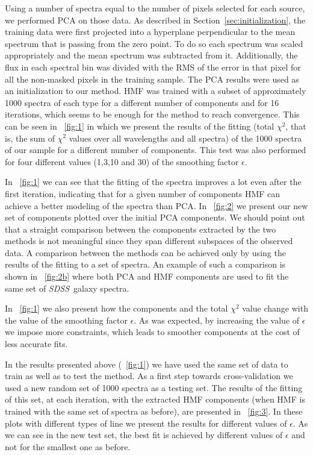 \documentclass[12pt,preprint]{aastex}
\newcommand{\project}[1]{\textsl{#1}}
\newcommand{\sdss}{\project{SDSS}}
\newcommand{\SDSS}{\sdss}
\newcommand{\sectionname}{Section}
\begin{document}
Using a number of spectra equal to the number of pixels selected for
each source, we performed PCA on those data. As described in 
\sectionname~\ref{sec:initialization}, the training data were
first projected into a hyperplane perpendicular to the mean
spectrum that is passing from the zero point. To do so each spectrum 
was scaled appropriately and the mean spectrum was subtracted from it. 
Additionally, the flux in each spectral bin was divided
with the RMS of the error in that pixel for all the non-masked pixels in
the training sample. The PCA results were used as an initialization to
our method. HMF was trained with a subset of approximately 1000
spectra of each type for a different number of components and for 16
iterations, which seems to be enough for the method to reach convergence. This
can be seen in \figurename~\ref{fig:1} in which we present the results of
the fitting (total $\chi^2$, that is, the sum of $\chi^2$ values over all
wavelengths and all spectra) of the 1000 spectra of our sample for a
different number of components. This test was also performed for four
different values (1,3,10 and 30) of the smoothing factor $\epsilon$.

In \figurename~\ref{fig:1} we can see that the fitting of the spectra
improves a lot even after the first iteration, indicating that for a 
given number of components HMF can achieve a better
modeling of the spectra than PCA. In \figurename~\ref{fig:2} 
we present our new set of components plotted over the
initial PCA components. We should point out that a straight comparison
between the components extracted by the two methods is not meaningful
since they span different subspaces of the observed data. A 
comparison between the methods can be achieved only by using
the results of the fitting to a set of spectra. An example of such a 
comparison is shown in \figurename~\ref{fig:2b} where both PCA and HMF 
components are used to fit the same set of \SDSS\ galaxy spectra.

In \figurename~\ref{fig:1} we also present how the components and the
total $\chi^2$ value change with the value of the smoothing factor
$\epsilon$. As was expected, by increasing the value of $\epsilon$ we 
impose more constraints, which leads to smoother components at the 
cost of less accurate fits. 

In the results presented above (\figurename~\ref{fig:1}) we have used
the same set of data to train as well as to test the method. As a
first step towards cross-validation we used a new random set of 1000
spectra as a testing set. The results of the fitting of this set, at
each iteration, with the extracted HMF components (when HMF is 
trained with the same set of spectra as before), are presented in
\figurename~\ref{fig:3}. In these plots with different types of line
we present the results for different values of $\epsilon$. As we can
see in the new test set, the best fit is achieved by different values
of $\epsilon$ and not for the smallest one as before.
\end{document}
